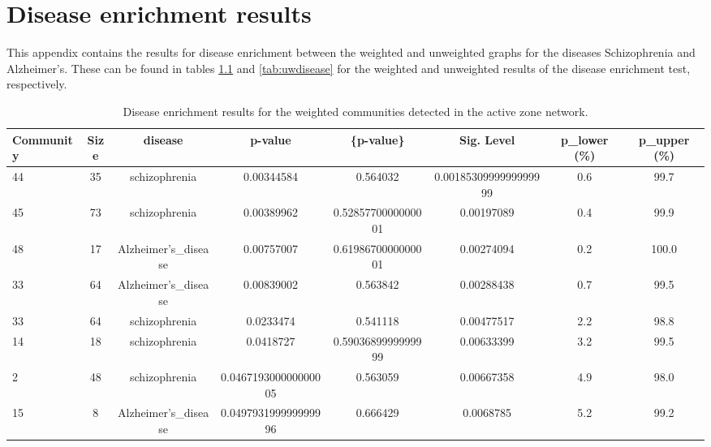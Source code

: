 \chapter{Disease enrichment results}

This appendix contains the results for disease enrichment between the weighted and unweighted graphs for the diseases Schizophrenia and Alzheimer's.
These can be found in tables \ref{tab:wdisease} and \ref{tab:uwdisease} for the weighted and unweighted results of the disease enrichment test, respectively.

\begin{table}
    \centering
    \begin{tabular}{l c c c c c c c}
        \small
    Community & Size & disease & p-value & \{p-value\} & Sig. Level & p_lower (\%) & p_upper (\%) \\
        \hline
    44 & 35 & schizophrenia & 0.00344584 & 0.564032 & 0.0018530999999999999 & 0.6 & 99.7 \\
    45 & 73 & schizophrenia & 0.00389962 & 0.5285770000000001 & 0.00197089 & 0.4 & 99.9 \\
    48 & 17 & Alzheimer's_disease & 0.00757007 & 0.6198670000000001 & 0.00274094 & 0.2 & 100.0 \\
    33 & 64 & Alzheimer's_disease & 0.00839002 & 0.563842 & 0.00288438 & 0.7 & 99.5 \\
    33 & 64 & schizophrenia & 0.0233474 & 0.541118 & 0.00477517 & 2.2 & 98.8 \\
    14 & 18 & schizophrenia & 0.0418727 & 0.5903689999999999 & 0.00633399 & 3.2 & 99.5 \\
    2 & 48 & schizophrenia & 0.046719300000000005 & 0.563059 & 0.00667358 & 4.9 & 98.0 \\
    15 & 8 & Alzheimer's_disease & 0.049793199999999996 & 0.666429 & 0.0068785 & 5.2 & 99.2 \\
    \end{tabular}
    \caption{Disease enrichment results for the weighted communities detected in the active zone network.}
    \label{tab:wdisease}
\end{table}
    

